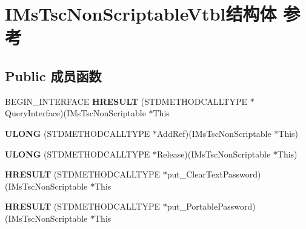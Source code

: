 \hypertarget{struct_i_ms_tsc_non_scriptable_vtbl}{}\section{I\+Ms\+Tsc\+Non\+Scriptable\+Vtbl结构体 参考}
\label{struct_i_ms_tsc_non_scriptable_vtbl}
\subsection*{Public 成员函数}
\begin{DoxyCompactItemize}
\item 
\mbox{\label{struct_i_ms_tsc_non_scriptable_vtbl_aec8058439aefc7e875746bccc7cca089}} 
B\+E\+G\+I\+N\+\_\+\+I\+N\+T\+E\+R\+F\+A\+CE {\bfseries H\+R\+E\+S\+U\+LT} (S\+T\+D\+M\+E\+T\+H\+O\+D\+C\+A\+L\+L\+T\+Y\+PE $\ast$Query\+Interface)(I\+Ms\+Tsc\+Non\+Scriptable $\ast$This
\item 
\mbox{\label{struct_i_ms_tsc_non_scriptable_vtbl_a1c0485d0a4512a60be6781daf9cc7566}} 
{\bfseries U\+L\+O\+NG} (S\+T\+D\+M\+E\+T\+H\+O\+D\+C\+A\+L\+L\+T\+Y\+PE $\ast$Add\+Ref)(I\+Ms\+Tsc\+Non\+Scriptable $\ast$This)
\item 
\mbox{\label{struct_i_ms_tsc_non_scriptable_vtbl_a87bbfc7c19e16f02f34f3f520a49d3fa}} 
{\bfseries U\+L\+O\+NG} (S\+T\+D\+M\+E\+T\+H\+O\+D\+C\+A\+L\+L\+T\+Y\+PE $\ast$Release)(I\+Ms\+Tsc\+Non\+Scriptable $\ast$This)
\item 
\mbox{\label{struct_i_ms_tsc_non_scriptable_vtbl_a82b5de90547c6bd999bd6b828e4ecb36}} 
{\bfseries H\+R\+E\+S\+U\+LT} (S\+T\+D\+M\+E\+T\+H\+O\+D\+C\+A\+L\+L\+T\+Y\+PE $\ast$put\+\_\+\+Clear\+Text\+Password)(I\+Ms\+Tsc\+Non\+Scriptable $\ast$This
\item 
\mbox{\label{struct_i_ms_tsc_non_scriptable_vtbl_a139522cf72d2d49ebeaf18d2bc1e4c91}} 
{\bfseries H\+R\+E\+S\+U\+LT} (S\+T\+D\+M\+E\+T\+H\+O\+D\+C\+A\+L\+L\+T\+Y\+PE $\ast$put\+\_\+\+Portable\+Password)(I\+Ms\+Tsc\+Non\+Scriptable $\ast$This
\item 
\mbox{\label{struct_i_ms_tsc_non_scriptable_vtbl_a8b40d506dc2a4812ba740089e0686ddf}} 

\end{DoxyCompactItemize}
